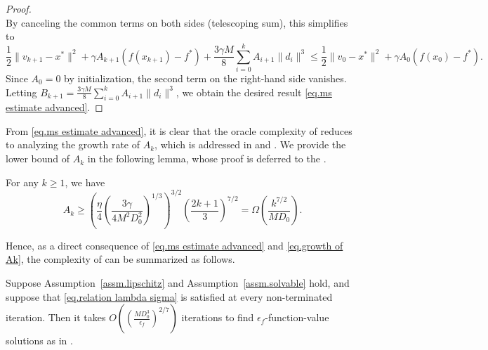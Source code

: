 \documentclass{article}
\begin{document}
\begin{proof}
\begin{equation*}
    \end{equation*}
    By canceling the common terms on both sides (telescoping sum), this simplifies to
    \begin{equation*}
        \frac{1}{2}\|v_{k+1}-x^* \|^2 +\gamma A_{k+1}\left(f(x_{k+1})-f^*\right) + \frac{3\gamma M}{8}\sum_{i=0}^{k}A_{i+1}\|d_i\|^3 \leq \frac{1}{2}\|v_0-x^*\|^2 +\gamma A_0 \left(f(x_0)-f^*\right).
    \end{equation*}
    Since $A_0 = 0$ by initialization, the second term on the right-hand side vanishes. Letting $B_{k+1} = \frac{3\gamma M}{8}\sum_{i=0}^{k}A_{i+1}\|d_i\|^3$, we obtain the desired result \eqref{eq.ms estimate advanced}.
\end{proof}
From \eqref{eq.ms estimate advanced}, it is clear that the oracle complexity of  reduces to analyzing the growth rate of $A_k$, which is addressed in \citet[Lemma 4.2]{monteiro2013accelerated} and \citet[Lemma 4.3.5]{nesterov2018lectures}. We provide the lower bound of $A_k$ in the following lemma, whose proof is deferred to the .
\begin{lemma}
    \label{lem.growth of Ak}
    For any $k\geq 1$, we have
    \begin{equation}
        \label{eq.growth of Ak}
        A_k \geq \left(\frac{\eta}{4}\left (\frac{3\gamma}{4M^2D_0^2}\right)^{1/3}\right)^{3 / 2}\left(\frac{2 k+1}{3}\right)^{7/2} = \Omega\left(\frac{k^{7/2}}{MD_0}\right).
    \end{equation}
\end{lemma}
Hence, as a direct consequence of \eqref{eq.ms estimate advanced} and \eqref{eq.growth of Ak}, the complexity of  can be summarized as follows.
\begin{theorem}
    \label{thm.outer loop complexity}
    Suppose Assumption~\ref{assm.lipschitz} and Assumption~\ref{assm.solvable}
    hold, and suppose that \eqref{eq.relation lambda sigma} is satisfied at every non-terminated
    iteration. Then it takes  $O\left(\left(\frac{MD_0^3}{\epsilon_f}\right)^{2/7}\right)$ iterations to find $\epsilon_f$-function-value solutions as in .
\end{theorem}
\end{document}
